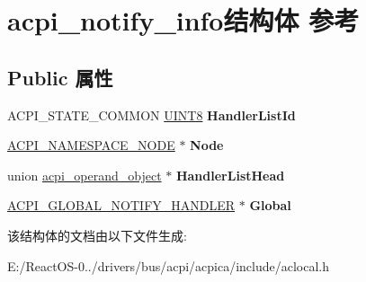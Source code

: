 \hypertarget{structacpi__notify__info}{}\section{acpi\+\_\+notify\+\_\+info结构体 参考}
\label{structacpi__notify__info}
\subsection*{Public 属性}
\begin{DoxyCompactItemize}
\item 
\mbox{\label{structacpi__notify__info_a513d36ab50b292de1dcd566cb2a87011}} 
A\+C\+P\+I\+\_\+\+S\+T\+A\+T\+E\+\_\+\+C\+O\+M\+M\+ON \hyperlink{_processor_bind_8h_ab27e9918b538ce9d8ca692479b375b6a}{U\+I\+N\+T8} {\bfseries Handler\+List\+Id}
\item 
\mbox{\label{structacpi__notify__info_a81db3fdedf9d7c7110aac849f89e6469}} 
\hyperlink{structacpi__namespace__node}{A\+C\+P\+I\+\_\+\+N\+A\+M\+E\+S\+P\+A\+C\+E\+\_\+\+N\+O\+DE} $\ast$ {\bfseries Node}
\item 
\mbox{\label{structacpi__notify__info_ad7fa3f57ce1ad18d698ffb6bad5f9ac7}} 
union \hyperlink{unionacpi__operand__object}{acpi\+\_\+operand\+\_\+object} $\ast$ {\bfseries Handler\+List\+Head}
\item 
\mbox{\label{structacpi__notify__info_a4c2edccc9933ebdcfaa467399b6d605e}} 
\hyperlink{structacpi__global__notify__handler}{A\+C\+P\+I\+\_\+\+G\+L\+O\+B\+A\+L\+\_\+\+N\+O\+T\+I\+F\+Y\+\_\+\+H\+A\+N\+D\+L\+ER} $\ast$ {\bfseries Global}
\end{DoxyCompactItemize}


该结构体的文档由以下文件生成\+:\begin{DoxyCompactItemize}
\item 
E\+:/\+React\+O\+S-\/0../drivers/bus/acpi/acpica/include/aclocal.\+h\end{DoxyCompactItemize}
